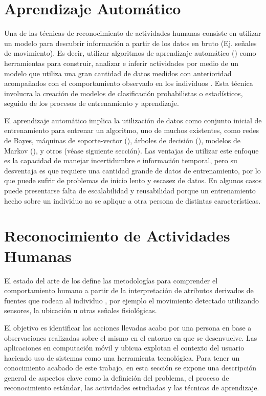 \section{Aprendizaje Automático}

\label{sec25:aprendizaje-automatico}Una de las técnicas de reconocimiento
de actividades humanas consiste en utilizar un modelo para descubrir
información a partir de los datos en bruto (Ej. señales de movimiento).
Es decir, utilizar algoritmos de aprendizaje automático ()
como herramientas para construir, analizar e inferir actividades por
medio de un modelo que utiliza una gran cantidad de datos medidos
con anterioridad acompañados con el comportamiento observado en los
individuos \cite{Chen2012}. Esta técnica involucra la creación de
modelos de clasificación probabilistas o estadísticos, seguido de
los procesos de entrenamiento y aprendizaje.

El aprendizaje automático implica la utilización de datos como conjunto
inicial de entrenamiento para entrenar un algoritmo, uno de muchos
existentes, como redes de Bayes, máquinas de soporte-vector (),
árboles de decisión (), modelos de Markov (),
y otros \cite{Rajaraman2011} (véase siguiente sección). Las ventajas
de utilizar este enfoque es la capacidad de manejar incertidumbre
e información temporal, pero su desventaja es que requiere una cantidad
grande de datos de entrenamiento, por lo que puede sufrir de problemas
de inicio lento y escasez de datos. En algunos casos puede presentarse
falta de escalabilidad y reusabilidad porque un entrenamiento hecho
sobre un individuo no se aplique a otra persona de distintas características.

\section{Reconocimiento de Actividades Humanas}

El estado del arte de los define las metodologías para
comprender el comportamiento humano a partir de la interpretación
de atributos derivados de fuentes que rodean al individuo \cite{Bao2004,Poppe2007},
por ejemplo el movimiento detectado utilizando sensores, la ubicación
u otras señales fisiológicas. 

El objetivo es identificar las acciones llevadas acabo por una persona
en base a observaciones realizadas sobre el mismo en el entorno en
que se desenvuelve. Las aplicaciones en computación móvil y ubicua
explotan el contexto del usuario haciendo uso de sistemas 
como una herramienta tecnológica. Para tener un conocimiento acabado
de este trabajo, en esta sección se expone una descripción general
de aspectos clave como la definición del problema, el proceso de reconocimiento
estándar, las actividades estudiadas y las técnicas de aprendizaje.

